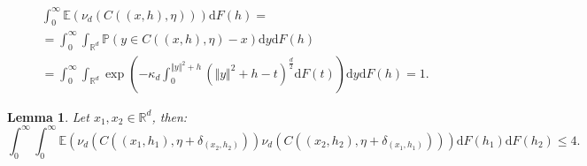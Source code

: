 \documentclass[10pt,a4paper]{amsart}
\newtheorem{lemma}{Lemma}
\newcommand{\EE}{\mathbb{E}}
\newcommand{\PP}{\mathbb{P}}
\newcommand{\RR}{\mathbb{R}}
\begin{document}
\begin{align}
    &\int_0^\infty \EE\left(\nu_d(C((x,h),\eta)) \right)\mathrm{d}F(h) = \nonumber\\ 
    &= \int_0^\infty \int_{\RR^d}\PP\left(y \in C((x,h),\eta)-x\right)\mathrm{d}y\mathrm{d}F(h) \nonumber\\
    &=\int_0^\infty\int_{\RR^d}  \exp\left(-\kappa_d \int_0^{\Vert y \Vert^2 +h}\left(\Vert y \Vert^2 +h -t \right)^{\frac{d}{2}}\mathrm{d}F(t) \right)\mathrm{d}y\mathrm{d}F(h) = 1. \label{mean_cell_volume1}
\end{align}

\begin{lemma}\label{lemma_bound_product_cell_volumes}
    Let $x_1,x_2 \in \RR^d$, then:
    \[\int_0^\infty \int_0^\infty \EE\left(\nu_d(C((x_1,h_1),\eta+\delta_{(x_2,h_2)}))\nu_d(C((x_2,h_2),\eta+\delta_{(x_1,h_1)})) \right)\mathrm{d}F(h_1)\mathrm{d}F(h_2) \leq 4.\]
\end{lemma}
\end{document}
